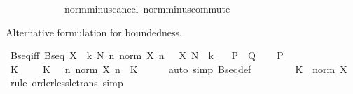 \begin{isabellebody}
\ \ \ \ \ \ \ \ \ \ \ \ norm{\isacharunderscore}{\kern0pt}minus{\isacharunderscore}{\kern0pt}cancel\ norm{\isacharunderscore}{\kern0pt}minus{\isacharunderscore}{\kern0pt}commute{\isacharparenright}{\kern0pt}%
\endisatagproof
{\isafoldproof}%
%
\isadelimproof
%
\endisadelimproof
%
\begin{isamarkuptext}%
Alternative formulation for boundedness.%
\end{isamarkuptext}\isamarkuptrue%
\isamarkupfalse%
\ Bseq{\isacharunderscore}{\kern0pt}iff{}{\isacharcolon}{\kern0pt}\ {\isachardoublequoteopen}Bseq\ X\ {\isasymlongleftrightarrow}\ {\isacharparenleft}{\kern0pt}{\isasymexists}k{\isachargreater}{\kern0pt}{}{\isachardot}{\kern0pt}\ {\isasymexists}N{\isachardot}{\kern0pt}\ {\isasymforall}n{\isachardot}{\kern0pt}\ norm\ {\isacharparenleft}{\kern0pt}X\ n\ {\isacharplus}{\kern0pt}\ {\isacharminus}{\kern0pt}\ X\ N{\isacharparenright}{\kern0pt}\ {\isasymle}\ k{\isacharparenright}{\kern0pt}{\isachardoublequoteclose}\isanewline
\ \ {\isacharparenleft}{\kern0pt}\ {\isachardoublequoteopen}{\isacharquery}{\kern0pt}P\ {\isasymlongleftrightarrow}\ {\isacharquery}{\kern0pt}Q{\isachardoublequoteclose}{\isacharparenright}{\kern0pt}\isanewline
%
\isadelimproof
%
\endisadelimproof
%
\isatagproof
{}\isamarkupfalse%
\isanewline
\ \ \isamarkupfalse%
\ {\isacharquery}{\kern0pt}P\isanewline
\ \ \isamarkupfalse%
\ \isamarkupfalse%
\ K\ \ {\isacharasterisk}{\kern0pt}{\isacharcolon}{\kern0pt}\ {\isachardoublequoteopen}{}\ {\isacharless}{\kern0pt}\ K{\isachardoublequoteclose}\ \ {\isacharasterisk}{\kern0pt}{\isacharasterisk}{\kern0pt}{\isacharcolon}{\kern0pt}\ {\isachardoublequoteopen}{\isasymAnd}n{\isachardot}{\kern0pt}\ norm\ {\isacharparenleft}{\kern0pt}X\ n{\isacharparenright}{\kern0pt}\ {\isasymle}\ K{\isachardoublequoteclose}\isanewline
\ \ \ \ \isamarkupfalse%
\ {\isacharparenleft}{\kern0pt}auto\ simp{\isacharcolon}{\kern0pt}\ Bseq{\isacharunderscore}{\kern0pt}def{\isacharparenright}{\kern0pt}\isanewline
\ \ \isamarkupfalse%
\ {\isacharasterisk}{\kern0pt}\ \isamarkupfalse%
\ {\isachardoublequoteopen}{}\ {\isacharless}{\kern0pt}\ K\ {\isacharplus}{\kern0pt}\ norm\ {\isacharparenleft}{\kern0pt}X\ {}{\isacharparenright}{\kern0pt}{\isachardoublequoteclose}\ \isamarkupfalse%
\ {\isacharparenleft}{\kern0pt}rule\ order{\isacharunderscore}{\kern0pt}less{\isacharunderscore}{\kern0pt}le{\isacharunderscore}{\kern0pt}trans{\isacharparenright}{\kern0pt}\ simp\isanewline

\end{isabellebody}
